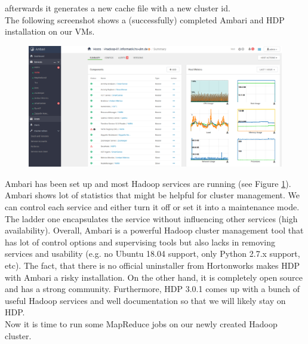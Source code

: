 afterwards it generates a new cache file with a new cluster id.\\
The following screenshot shows a (successfully) completed Ambari and HDP installation on our VMs.
\begin{figure}[H]
\hspace{-3.4cm}
\includegraphics[width=1.5\textwidth]{img/ambari}
\label{pic:ambari}
\end{figure}
\noindent Ambari has been set up and most Hadoop services are running (see Figure \ref{pic:ambari}). Ambari shows lot of statistics that might be helpful for cluster management. We can control each service and either turn it off or set it into a maintenance mode. The ladder one encapsulates the service without influencing other services (high availability). Overall, Ambari is a powerful Hadoop cluster management tool that has lot of control options and supervising tools but also lacks in removing services and usability (e.g. no Ubuntu 18.04 support, only Python 2.7.x support, etc). The fact, that there is no official uninstaller from Hortonworks makes HDP with Ambari a risky installation. On the other hand, it is completely open source and has a strong community. Furthermore, HDP 3.0.1 comes up with a bunch of useful Hadoop services and well documentation so that we will likely stay on HDP.\\ Now it is time to run some MapReduce jobs on our newly created Hadoop cluster. 
